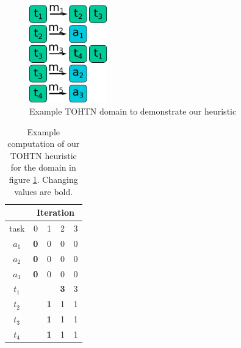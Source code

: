 \begin{figure}
	\caption{Example TOHTN domain to demonstrate our heuristic}
	\label{figure: heuristic example}
	\centering
	\includegraphics[width=0.3\textwidth]{images/final/heuristic_example}
\end{figure}

\begin{table}
	\caption{Example computation of our TOHTN heuristic for the domain in figure \ref{figure: heuristic example}. Changing values are bold.}
	\label{table: heuristic example}
	\centering
	\begin{tabular}{| c | c | c | c | c |}
		\hline
			  	& \multicolumn{4}{|c|}{Iteration} \\
		\hline
		task  	& 0			& 1 			& 2 			& 3 \\
		\hline
		$a_1$	& \textbf{0} 	& 0				& 0				& 0 \\
		$a_2$ 	& \textbf{0} 	& 0				& 0				& 0 \\
		$a_3$ 	& \textbf{0} 	& 0				& 0				& 0 \\
		$t_1$ 	&   			& 				& \textbf{3}	& 3 \\
		$t_2$ 	&   			& \textbf{1}	& 1				& 1 \\
		$t_3$ 	&   			& \textbf{1}	& 1				& 1 \\
		$t_4$ 	&   			& \textbf{1}	& 1				& 1 \\
		\hline
	\end{tabular}
\end{table}

